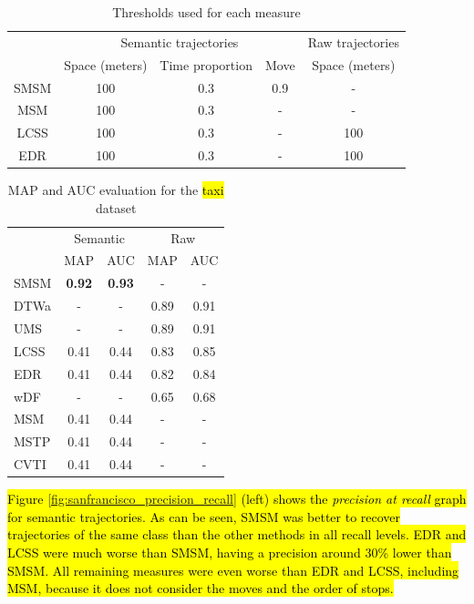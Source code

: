 \documentclass[12pt]{article}
\begin{document}
\begin{table}[!h]
\scriptsize
  \centering
  \begin{tabular}{|c|c|c|c|c|}
  	\hline
  & \multicolumn{3}{c|}{Semantic trajectories} & \multicolumn{1}{c|}{Raw trajectories} \\
 	\cline{2-5}
  & Space (meters) & Time proportion & Move & Space (meters) \\
  	\hline
 SMSM & 100 & 0.3 & 0.9 & - \\
 MSM & 100 & 0.3 & - & - \\
 LCSS & 100 & 0.3 & - & 100 \\
 EDR & 100 & 0.3 & - & 100 \\
    \hline
  \end{tabular}
  \caption{Thresholds used for each measure}
  \label{tab:san_francisco_thresholds}
\end{table}


\begin{table}[h]
\scriptsize
  \centering
  \begin{tabular}{|l|c|c|c|c|}
  	\hline
 & \multicolumn{2}{c}{Semantic} & \multicolumn{2}{|c|}{Raw} \\
 	\cline{2-5}
 & MAP & AUC & MAP & AUC \\
  	\hline
SMSM & \textbf{0.92} & \textbf{0.93} & - & -\\
DTWa & - & - & 0.89 & 0.91 \\
UMS & - & - & 0.89 & 0.91 \\
LCSS & 0.41 & 0.44 & 0.83 & 0.85 \\
EDR & 0.41 & 0.44 & 0.82 & 0.84 \\
wDF & - & - & 0.65 & 0.68 \\
MSM & 0.41 & 0.44 & - & - \\
MSTP & 0.41 & 0.44 & - & - \\
CVTI & 0.41 & 0.44 & - & - \\
    \hline
  \end{tabular}
  \caption{MAP and AUC evaluation for the \hl{taxi} dataset}
  \label{tab:sanfrancisco_measures_map_auc}
\end{table}

\hl{Figure {\ref{fig:sanfrancisco_precision_recall}} (left) shows the \emph{precision at recall} graph for semantic trajectories. As can be seen, SMSM was better to recover trajectories of the same class than the other methods in all recall levels. EDR and LCSS were much worse than SMSM, having a precision around 30\% lower than SMSM.  All remaining measures were even worse than EDR and LCSS, including MSM, because it does not consider the moves and the order of stops.}
\end{document}

